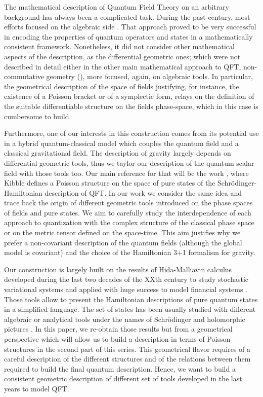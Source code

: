 \documentclass[12pt]{article}%
\begin{document}
The mathematical description of Quantum Field Theory on an arbitrary background has always been a complicated task. During the past century, most efforts focused on the algebraic side \cite{Haag1964, Streater1989,Doplicher1969,Doplicher1969a,Doplicher1971,Doplicher1974,Buchholz1982,Buchholz2020}. That approach proved to be very successful in encoding the properties of quantum operators and states in a mathematically consistent framework. Nonetheless, it did not consider other mathematical aspects of the description, as  the differential geometric ones; which were not described in detail either in the other main mathematical approach to QFT, non-commutative geometry (\cite{connesNoncommutativeGeometry1994,connesRenormalizationQuantumField2000}), more focused, again, on algebraic tools.   In particular, the geometrical description of the space of fields justifying, for instance, the existence of a Poisson bracket or of a symplectic form, relays on the definition of the suitable differentiable structure on the fields phase-space, which in this case is cumbersome to build. 

 Furthermore, one of our interests in this construction comes from its potential use in a hybrid quantum-classical model which couples the quantum field and a classical gravitational field. The description of gravity largely depends on differential geometric tools, thus we taylor our  description of  the quantum scalar field  with those tools too. Our main reference for that will be the work  \cite{Kibble1979}, where Kibble defines a Poisson structure on the space of pure states of the Schrödinger-Hamiltonian description of  QFT.   
 In our work we consider the same idea and trace back the origin of different geometric tools  introduced on the phase spaces of fields and pure states. We aim to carefully study the interdependence of each approach to quantization with the complex structure of the classical phase space or on the metric tensor defined on the space-time.  This aim justifies why we prefer  a non-covariant description of the quantum fields (although the global model is covariant) and the choice of the Hamiltonian 3+1 formalism for  gravity.      


Our construction is largely built on the results of Hida-Malliavin calculus developed during the last two decades of the XXth century to study stochastic variational systems and applied with huge success to model financial systems \cite{Hida1980,Hida1993,Nunno2009, Wester2003}. Those tools allow to present the Hamiltonian descriptions of pure quantum states in a simplified language. The set of states has been usually studied with different algebraic or analytical tools under the names of  Schrödinger and holomorphic pictures \cite{Corichi2004,Oeckl2012,Oeckl2012a}.  In this paper, we re-obtain those results but from a geometrical perspective which will allow us to build a description in terms of Poisson structures in the second part of this series.
  This geometrical flavor requires of a careful description of the different structures and of the relations between them required to build the final quantum description.  Hence, we want to build a consistent geometric description of  different set of tools developed in the last years to model QFT.
\end{document}
